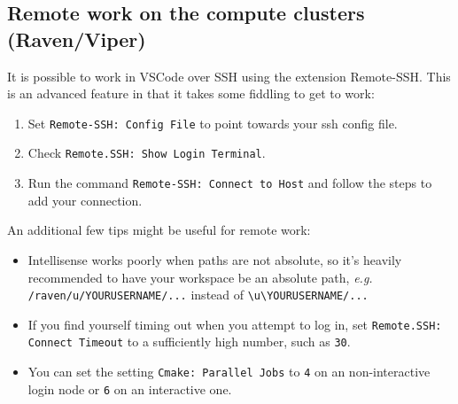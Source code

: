 \documentclass[11pt]{article}
\begin{document}
\subsection{Remote work on the compute clusters (Raven/Viper)}
It is possible to work in VSCode over SSH using the extension Remote-SSH. This is an advanced feature in that it takes some fiddling to get to work:
\begin{enumerate}
   \item Set \verb|Remote-SSH: Config File| to point towards your ssh config file.
   \item Check \verb|Remote.SSH: Show Login Terminal|.
   \item Run the command \verb|Remote-SSH: Connect to Host| and follow the steps to add your connection.
\end{enumerate}

An additional few tips might be useful for remote work:
\begin{itemize}
   \item Intellisense works poorly when paths are not absolute, so it's heavily recommended to have your workspace be an absolute path, \emph{e.g.} \verb|/raven/u/YOURUSERNAME/...| instead of \verb|\u\YOURUSERNAME/...|
   \item If you find yourself timing out when you attempt to log in, set \verb|Remote.SSH: Connect Timeout| to a sufficiently high number, such as \verb|30|.
   \item You can set the setting \verb|Cmake: Parallel Jobs| to \verb|4| on an non-interactive login node or \verb|6| on an interactive one.
\end{itemize}
\end{document}
